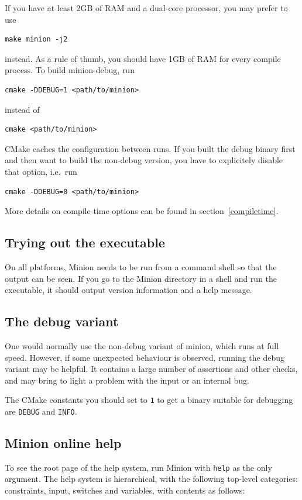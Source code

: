 \documentclass[oneside]{book}
\begin{document}
If you have at least 2GB of RAM and a dual-core processor, you may prefer to
use
\begin{verbatim}
make minion -j2
\end{verbatim}
instead. As a rule of thumb, you should have 1GB of RAM for every compile
process. To build minion-debug, run
\begin{verbatim}
cmake -DDEBUG=1 <path/to/minion>
\end{verbatim}
instead of
\begin{verbatim}
cmake <path/to/minion>
\end{verbatim}
CMake caches the configuration between runs. If you built the debug binary first
and then want to build the non-debug version, you have to explicitely disable
that option, i.e.\ run
\begin{verbatim}
cmake -DDEBUG=0 <path/to/minion>
\end{verbatim}

More details on compile-time options can be found in section~\ref{compiletime}.

\subsection{Trying out the executable}

On all platforms, Minion needs to be run from a command shell so that
the output can be seen. If you go to the Minion directory in a shell
and run the executable, it should output version information and a
help message. 


\subsection{The debug variant}

One would normally use the non-debug variant of minion, which runs
at full speed. However, if some unexpected behaviour is observed,
running the debug variant may be helpful. It contains a large number
of assertions and other checks, and may bring to light a problem with
the input or an internal bug.

The CMake constants you should set to \verb+1+ to get a binary suitable for
debugging are \verb+DEBUG+ and \verb+INFO+.


\subsection{Minion online help}

To see the root page of the help system, run Minion with \texttt{help}
as the only argument. The help system is hierarchical, with the following
top-level categories: constraints, input, switches and variables,
with contents as follows:
\end{document}
